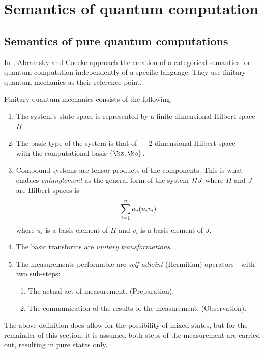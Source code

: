 \section{Semantics of quantum computation}%
\label{sec:semanticsquantum}

\subsection{Semantics of pure quantum computations}\label{sec:puresemantics}
In \cite{abramsky04:catsemquantprot}, Abramsky and Coecke approach the creation of a categorical semantics
for quantum computation independently of a specific language. They use finitary quantum
mechanics as their reference point.

Finitary quantum mechanics consists of the following:
\begin{enumerate}
  \item The system's state space is represented by a finite dimensional Hilbert space $H$.
    \label{lis:qfm1}
  \item The basic type of the system is that of \qubit --- 2-dimensional Hilbert space --- with the
    computational basis $\{\kz, \ko\}$.\label{lis:qfm2}
  \item Compound systems are tensor products of the components. This is what enables
    \emph{entanglement} as the general form of the system $H\*J$ where $H$ and $J$ are Hilbert
    spaces is
    \[
      \sum_{i=1}^{n}\alpha_{i} (u_{i} \* v_{i})
    \]
    where $u_{i}$ is a basis element of $H$ and $v_{i}$ is a basis element of $J$.\label{lis:qfm3}
  \item The basic transforms are \emph{unitary transformations}. \label{lis:qfm4}
  \item The measurements performable are \emph{self-adjoint} (Hermitian) operators - with two
    sub-steps:\label{lis:qfm5}
    \begin{enumerate}
      \item The actual act of measurement. (Preparation).\label{lis:qfm5a}
      \item The communication of the results of the measurement. (Observation).\label{lis:qfm5b}
    \end{enumerate}
\end{enumerate}
The above definition does allow for the possibility of mixed states, but for the
remainder of this section, it is assumed both steps of the
measurement are carried out, resulting in pure states only.

